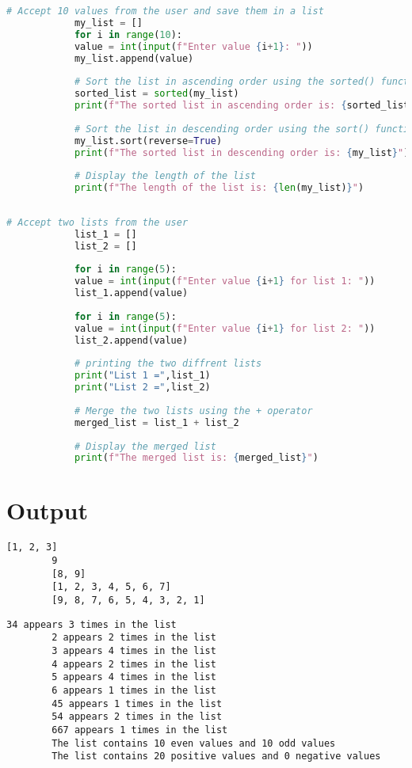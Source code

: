 \documentclass{article}
\begin{document}
		\begin{lstlisting}[language=python, caption={Exercise 3 Input}]
			# Accept 10 values from the user and save them in a list
			my_list = []
			for i in range(10):
			value = int(input(f"Enter value {i+1}: "))
			my_list.append(value)
			
			# Sort the list in ascending order using the sorted() function and display the sorted list
			sorted_list = sorted(my_list)
			print(f"The sorted list in ascending order is: {sorted_list}")
			
			# Sort the list in descending order using the sort() function and display the sorted list
			my_list.sort(reverse=True)
			print(f"The sorted list in descending order is: {my_list}")
			
			# Display the length of the list
			print(f"The length of the list is: {len(my_list)}")
			
		\end{lstlisting}
	
		\begin{lstlisting}[language=python, caption={Exercise 4 Input}]
			# Accept two lists from the user
			list_1 = []
			list_2 = []
			
			for i in range(5):
			value = int(input(f"Enter value {i+1} for list 1: "))
			list_1.append(value)
			
			for i in range(5):
			value = int(input(f"Enter value {i+1} for list 2: "))
			list_2.append(value)
			
			# printing the two diffrent lists 
			print("List 1 =",list_1)
			print("List 2 =",list_2)
			
			# Merge the two lists using the + operator
			merged_list = list_1 + list_2
			
			# Display the merged list
			print(f"The merged list is: {merged_list}")
		\end{lstlisting}
	
	\section{\textbf{Output}}
		\begin{lstlisting}[caption={Exercise 1 Output}]
		[1, 2, 3]
		9
		[8, 9]
		[1, 2, 3, 4, 5, 6, 7]
		[9, 8, 7, 6, 5, 4, 3, 2, 1]
	\end{lstlisting}

	\begin{lstlisting}[caption={Exercise 2 Output}]
		34 appears 3 times in the list
		2 appears 2 times in the list
		3 appears 4 times in the list
		4 appears 2 times in the list
		5 appears 4 times in the list
		6 appears 1 times in the list
		45 appears 1 times in the list
		54 appears 2 times in the list
		667 appears 1 times in the list
		The list contains 10 even values and 10 odd values
		The list contains 20 positive values and 0 negative values
	\end{lstlisting}
\end{document}
